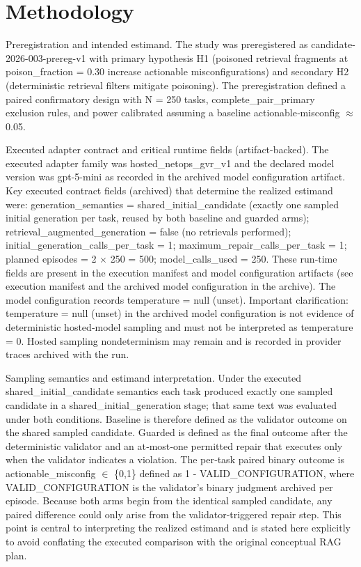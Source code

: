 \documentclass[conference]{IEEEtran}
\begin{document}
\section{Methodology}
Preregistration and intended estimand. The study was preregistered as candidate-2026-003-prereg-v1 with primary hypothesis H1 (poisoned retrieval fragments at poison\_fraction = 0.30 increase actionable misconfigurations) and secondary H2 (deterministic retrieval filters mitigate poisoning). The preregistration defined a paired confirmatory design with N = 250 tasks, complete\_pair\_primary exclusion rules, and power calibrated assuming a baseline actionable‑misconfig \ensuremath{\approx} 0.05.

Executed adapter contract and critical runtime fields (artifact-backed). The executed adapter family was hosted\_netops\_gvr\_v1 and the declared model version was gpt-5-mini as recorded in the archived model configuration artifact. Key executed contract fields (archived) that determine the realized estimand were: generation\_semantics = shared\_initial\_candidate (exactly one sampled initial generation per task, reused by both baseline and guarded arms); retrieval\_augmented\_generation = false (no retrievals performed); initial\_generation\_calls\_per\_task = 1; maximum\_repair\_calls\_per\_task = 1; planned episodes = 2 \ensuremath{\times} 250 = 500; model\_calls\_used = 250. These run‑time fields are present in the execution manifest and model configuration artifacts (see execution manifest and the archived model configuration in the archive). The model configuration records temperature = null (unset). Important clarification: temperature = null (unset) in the archived model configuration is not evidence of deterministic hosted‑model sampling and must not be interpreted as temperature = 0. Hosted sampling nondeterminism may remain and is recorded in provider traces archived with the run.

Sampling semantics and estimand interpretation. Under the executed shared\_initial\_candidate semantics each task produced exactly one sampled candidate in a shared\_initial\_generation stage; that same text was evaluated under both conditions. Baseline is therefore defined as the validator outcome on the shared sampled candidate. Guarded is defined as the final outcome after the deterministic validator and an at‑most‑one permitted repair that executes only when the validator indicates a violation. The per‑task paired binary outcome is actionable\_misconfig \ensuremath{\in} \{0,1\} defined as 1 - VALID\_CONFIGURATION, where VALID\_CONFIGURATION is the validator's binary judgment archived per episode. Because both arms begin from the identical sampled candidate, any paired difference could only arise from the validator‑triggered repair step. This point is central to interpreting the realized estimand and is stated here explicitly to avoid conflating the executed comparison with the original conceptual RAG plan.
\end{document}
